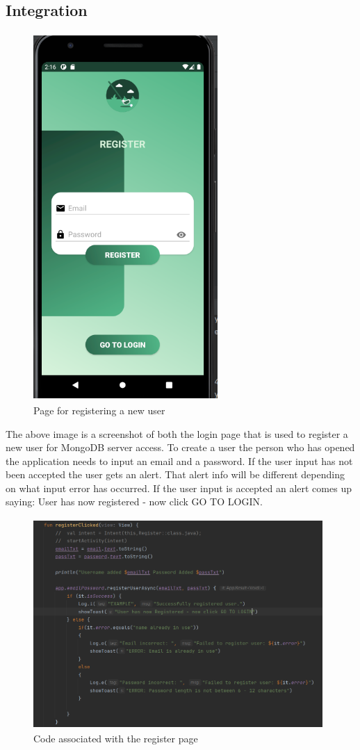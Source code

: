 \subsection{Integration}
\begin{figure}[H]
    \centering
    \includegraphics[width=7cm, height = 14cm]{img/registerPage.PNG}
    \caption{Page for registering a new user}
    \label{fig:altas config}
\end{figure}
The above image is a screenshot of both the login page that is used to register a new user for MongoDB server access. To create a user the person who has opened the application needs to input an email and a password. If the user input has not been accepted the user gets an alert. That alert info will be different depending on what input error has occurred. If the user input is accepted an alert comes up saying: User has now registered - now click GO TO LOGIN.
\begin{figure}[H]
    \centering
    \includegraphics[width=11cm, height= 8cm]{img/registerCode.PNG}
    \caption{Code associated with the register page}
    \label{fig:altas config}
\end{figure}
